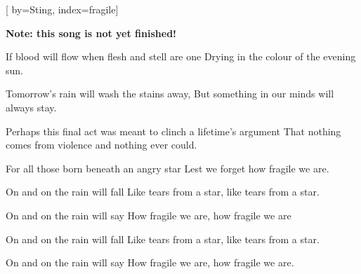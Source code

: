 

[%
    by={Sting},
    index={fragile}]


    \label{fragile}

    \textbf{Note: this song is not yet finished!}

    \beginverse
        If blood will flow when flesh and stell are one
        Drying in the colour of the evening sun.

        Tomorrow's rain will wash the stains away,
        But something in our minds will always stay.

        Perhaps this final act was meant to clinch a lifetime's argument
        That nothing comes from violence and nothing ever could.

        For all those born beneath an angry star
        Lest we forget how fragile we are.
    \endverse

    \beginchorus
        On and on the rain will fall
        Like tears from a star, like tears from a star.

        On and on the rain will say
        How fragile we are, how fragile we are
    \endchorus

    \beginverse*
    \endverse

    \beginchorus
        On and on the rain will fall
        Like tears from a star, like tears from a star.

        On and on the rain will say
        How fragile we are, how fragile we are. 
    \endchorus
\endsong
